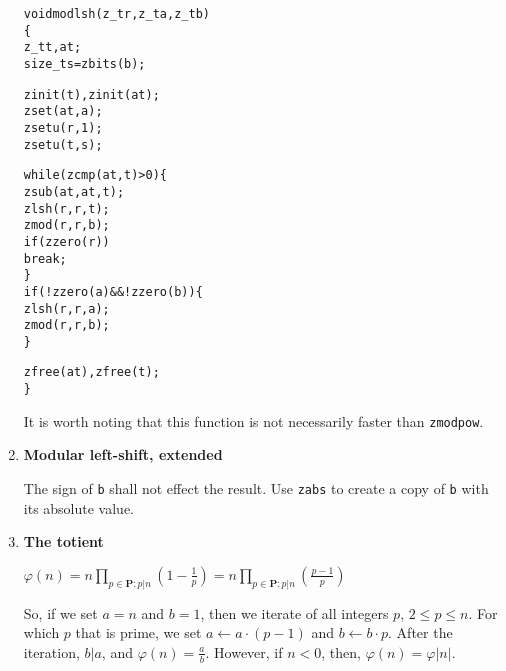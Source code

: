 \begin{enumerate}[label=\textbf{\arabic*}.]
\vspace{-1em}
\begin{alltt}
void modlsh(z_t r, z_t a, z_t b)
\{
    z_t t, at;
    size_t s = zbits(b);

    zinit(t), zinit(at);
    zset(at, a);
    zsetu(r, 1);
    zsetu(t, s);

    while (zcmp(at, t) > 0) \{
        zsub(at, at, t);
        zlsh(r, r, t);
        zmod(r, r, b);
        if (zzero(r))
            break;
    \}
    if (!zzero(a) && !zzero(b)) \{
        zlsh(r, r, a);
        zmod(r, r, b);
    \}

    zfree(at), zfree(t);
\}
\end{alltt}
\vspace{-1em}

It is worth noting that this function is
not necessarily faster than \texttt{zmodpow}.



\item \textbf{Modular left-shift, extended}

The sign of \texttt{b} shall not effect the
result. Use \texttt{zabs} to create a copy
of \texttt{b} with its absolute value.



\item \textbf{The totient}

\( \displaystyle{
    \varphi(n)
    = n \prod_{p \in \textbf{P} : p | n} \left ( 1 - \frac{1}{p} \right )
    = n \prod_{p \in \textbf{P} : p | n} \left ( \frac{p - 1}{p} \right )
}\)

\noindent
So, if we set $a = n$ and $b = 1$, then we iterate
of all integers $p$, $2 \le p \le n$. For which $p$
that is prime, we set $a \gets a \cdot (p - 1)$ and
$b \gets b \cdot p$. After the iteration, $b | a$,
and $\varphi(n) = \frac{a}{b}$. However, if $n < 0$,
then, $\varphi(n) = \varphi|n|$.




\end{enumerate}
